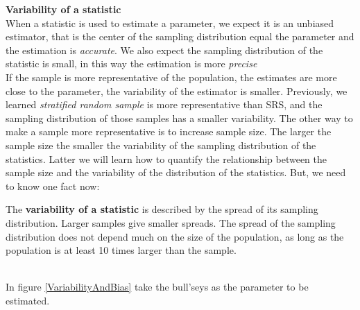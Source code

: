 \documentclass[a4paper, 12pt,twoside]{book}
\begin{document}
 \noindent \textbf{Variability of a statistic}\vspace{0.3cm}\\ 
 \noindent When a statistic is used to estimate a parameter, we expect it is an unbiased estimator, that is the center of the sampling distribution equal the parameter and the estimation is \textit{accurate}. We also expect the sampling distribution of the statistic  is small, in this way the estimation is more \textit{precise} \vspace{0.3cm}\\
If the sample is more representative of the population, the estimates are more close to the parameter, the variability of the estimator is smaller. Previously, we learned \textit{stratified random sample} is more representative than SRS, and the sampling distribution of those samples has a smaller variability. The other way to make a sample more representative is to increase sample size. The larger the sample size the smaller the variability of the sampling distribution of the statistics. Latter we will learn how to quantify the relationship between the sample size and the variability of the distribution of the statistics. But, we need to know one fact now:\vspace{0.3cm}\\

   
   \noindent \colorbox{babypink}{\parbox{\textwidth}{
    The \textbf{variability of a statistic} is described by the spread of its sampling distribution.  Larger samples give smaller spreads. The spread of the sampling distribution does not depend much on the size of the population, as long as the population is at least 10 times larger than the sample.
    }}\vspace{0.3cm}\\
    
  \noindent  In figure \ref{VariabilityAndBias} take the bull's\textendash eys as the parameter to be estimated.
    
\end{document}
